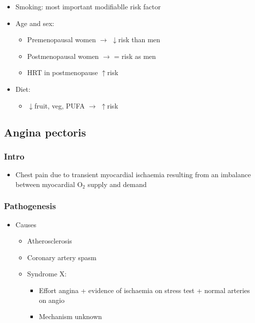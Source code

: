 \documentclass[
  12pt,
]{memoir}
\providecommand{\tightlist}{%
  \setlength{\itemsep}{0pt}\setlength{\parskip}{0pt}}
\begin{document}
\begin{itemize}
\tightlist
\item
  Smoking: most important modifiablle risk factor
\item
  Age and sex:

  \begin{itemize}
  \tightlist
  \item
    Premenopausal women \(\rightarrow\) \(\downarrow\)risk than men
  \item
    Postmenopausal women \(\rightarrow\) = risk as men
  \item
    HRT in postmenopause \(\uparrow\)risk
  \end{itemize}
\item
  Diet:

  \begin{itemize}
  \tightlist
  \item
    \(\downarrow\)fruit, veg, PUFA \(\rightarrow\) \(\uparrow\)risk
  \end{itemize}
\end{itemize}

\hypertarget{angina-pectoris}{%
\subsection{Angina pectoris}\label{angina-pectoris}}

\hypertarget{intro-2}{%
\subsubsection{Intro}\label{intro-2}}

\begin{itemize}
\tightlist
\item
  Chest pain due to transient myocardial ischaemia resulting from an
  imbalance between myocardial O\(_2\) supply and demand
\end{itemize}

\hypertarget{pathogenesis}{%
\subsubsection{Pathogenesis}\label{pathogenesis}}

\begin{itemize}
\tightlist
\item
  Causes

  \begin{itemize}
  \tightlist
  \item
    Atherosclerosis
  \item
    Coronary artery spasm
  \item
    Syndrome X:

    \begin{itemize}
    \tightlist
    \item
      Effort angina + evidence of ischaemia on stress test + normal
      arteries on angio
    \item
      Mechanism unknown
    \end{itemize}
  \end{itemize}
\end{itemize}
\end{document}
